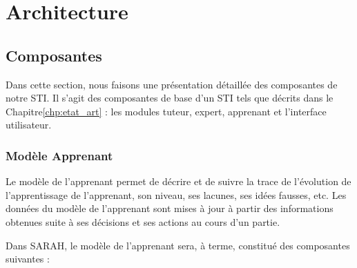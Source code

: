 
\chapter{Architecture}
\label{chp:models}


\section{Composantes}

Dans cette section, nous faisons une présentation détaillée des composantes de notre STI. Il s'agit des composantes de base d'un STI tels que décrits dans le Chapitre\ref{chp:etat_art} : les modules tuteur, expert, apprenant et l'interface utilisateur.




    \subsection{Modèle Apprenant}   
 Le modèle de l'apprenant permet de décrire et de suivre la trace de l'évolution de l'apprentissage de l'apprenant, son niveau, ses lacunes, ses idées fausses, etc. Les données du modèle de l'apprenant sont mises à jour à partir des informations obtenues suite à ses décisions et ses actions au cours d'un partie.
 
  Dans SARAH, le modèle de l'apprenant sera, à terme, constitué des composantes suivantes :
 
